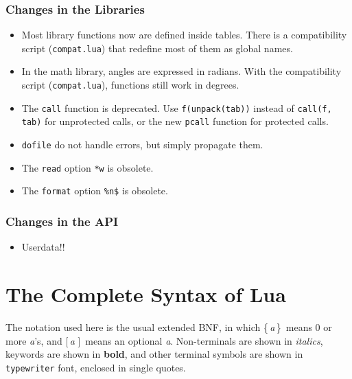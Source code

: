 \documentclass[11pt,twoside]{article}
\renewcommand{\rep}[1]{{\rm\{}\,#1\,{\rm\}}}
\renewcommand{\opt}[1]{{\rm [}\,#1\,{\,\rm]}}
\begin{document}
\subsubsection*{Changes in the Libraries}
\begin{itemize}

\item
Most library functions now are defined inside tables.
There is a compatibility script (\verb|compat.lua|) that
redefine most of them as global names.

\item
In the math library, angles are expressed in radians.
With the compatibility script (\verb|compat.lua|),
functions still work in degrees.

\item
The \verb|call| function is deprecated.
Use \verb|f(unpack(tab))| instead of \verb|call(f, tab)|
for unprotected calls,
or the new \verb|pcall| function for protected calls.

\item
\verb|dofile| do not handle errors, but simply propagate them.

\item
The \verb|read| option \verb|*w| is obsolete.

\item
The \verb|format| option \verb|%n$| is obsolete.

\end{itemize}


\subsubsection*{Changes in the API}
\begin{itemize}

\item
Userdata!!

\end{itemize}

\newpage
\section*{The Complete Syntax of Lua} \label{BNF}

The notation used here is the usual extended BNF,
in which
\rep{\emph{a}}~means 0 or more \emph{a}'s, and
\opt{\emph{a}}~means an optional \emph{a}.
Non-terminals are shown in \emph{italics},
keywords are shown in {\bf bold},
and other terminal symbols are shown in {\tt typewriter} font,
enclosed in single quotes.
\end{document}
